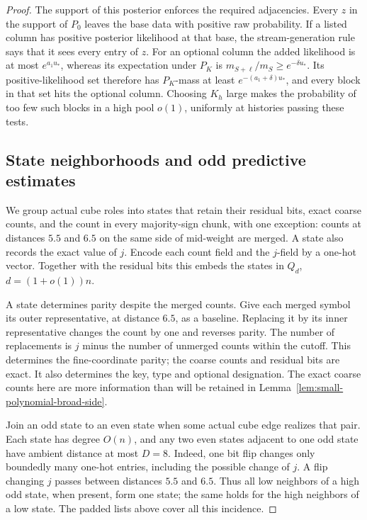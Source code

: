 \begin{proof}
The support of this posterior enforces the required adjacencies. Every
\(z\) in the support of \(P_0\) leaves the base data with positive raw
probability. If a listed column has positive posterior likelihood at
that base, the stream-generation rule says that it sees every entry of
\(z\). For an optional column the added likelihood is at most
\(e^{a_1u_*}\), whereas its expectation under \(P_K\) is
\(m_{S+\ell}/m_S\ge e^{-\delta u_*}\). Its positive-likelihood set
therefore has \(P_K\)-mass at least \(e^{-(a_1+\delta)u_*}\), and every
block in that set hits the optional column. Choosing \(K_h\) large
makes the probability of too few such blocks in a high pool \(o(1)\),
uniformly at histories passing these tests.

\subsection{State neighborhoods and odd predictive estimates}
\label{sec:state-neighborhoods-and-odd-predictive-estimates}

We group actual cube roles into states that retain their residual bits,
exact coarse counts, and the count in every majority-sign chunk, with one
exception: counts at distances \(5.5\) and \(6.5\) on the same side of
mid-weight are merged. A state also records the exact value of \(j\).
Encode each count field and the \(j\)-field by a one-hot vector. Together
with the residual bits this embeds the states in
\(Q_d\), \(d=(1+o(1))n\).

A state determines parity despite the merged counts. Give each merged
symbol its outer representative, at distance \(6.5\), as a baseline.
Replacing it by its inner representative changes the count by one and
reverses parity. The number of replacements is \(j\) minus the number
of unmerged counts within the cutoff. This determines the fine-coordinate
parity; the coarse counts and residual bits are exact. It also determines
the key, type and optional designation. The exact coarse counts here are
more information than will be retained in
Lemma~\ref{lem:small-polynomial-broad-side}.

Join an odd state to an even state when some actual cube edge realizes
that pair. Each state has degree \(O(n)\), and any two even states
adjacent to one odd state have ambient distance at most \(D=8\). Indeed,
one bit flip changes only boundedly many one-hot entries, including the
possible change of \(j\). A flip changing \(j\) passes between distances
\(5.5\) and \(6.5\). Thus all low neighbors of a high odd state, when
present, form one state; the same holds for the high neighbors of a low
state. The padded lists above cover all this incidence.


\end{proof}
